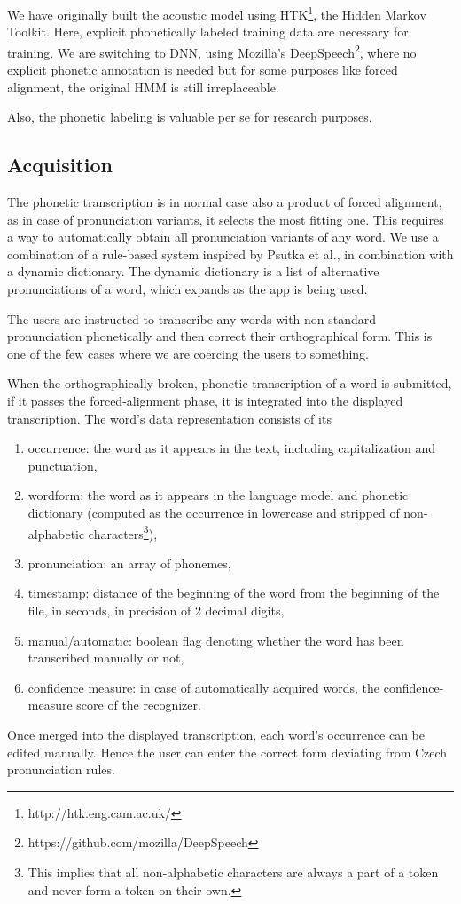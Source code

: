 \documentclass{itatnew}
\begin{document}
We have originally built the acoustic model using
HTK\footnote{http://htk.eng.cam.ac.uk/}, the Hidden Markov Toolkit. Here,
explicit phonetically labeled training data are necessary for training. We are
switching to DNN, using Mozilla's
DeepSpeech\footnote{https://github.com/mozilla/DeepSpeech}, where no explicit
phonetic annotation is needed but for some purposes like forced alignment, the
original HMM is still irreplaceable.

Also, the phonetic labeling is valuable per se for research purposes.

\subsection{Acquisition}

The phonetic transcription is in normal case also a product of forced alignment,
as in case of pronunciation variants, it selects the most fitting one. This
requires a way to automatically obtain all pronunciation variants of any word.
We use a combination of a rule-based system inspired by Psutka et
al.\cite{psutka2004development}, in combination with a dynamic dictionary.
The dynamic dictionary is a list of alternative pronunciations of a word, which
expands as the app is being used.

The users are instructed to transcribe any words with non-standard pronunciation
phonetically and then correct their orthographical form. This is one of the few
cases where we are coercing the users to something.

When the orthographically broken, phonetic transcription of a word is submitted,
if it passes the forced-alignment phase, it is integrated into the displayed
transcription. The word's data representation consists of its
\begin{enumerate}
\item{occurrence:
    the word as it appears in the text, including capitalization and
    punctuation,
}
\item{wordform:
    the word as it appears in the language model and phonetic dictionary
    (computed as the occurrence in lowercase and stripped of non-alphabetic
    characters\footnote{This implies that all non-alphabetic characters are
    always a part of a token and never form a token on their own.}),
}
\item{pronunciation:
    an array of phonemes,
}
\item{timestamp:
    distance of the beginning of the word from the beginning of the file, in
    seconds, in precision of 2 decimal digits,
}
\item{manual/automatic:
    boolean flag denoting whether the word has been transcribed manually or not,
}
\item{confidence measure:
    in case of automatically acquired words, the confidence-measure score of the
    recognizer.
}
\end{enumerate}
Once merged into the displayed transcription, each word's occurrence can be
edited manually. Hence the user can enter the correct form deviating from Czech
pronunciation rules.
\end{document}
